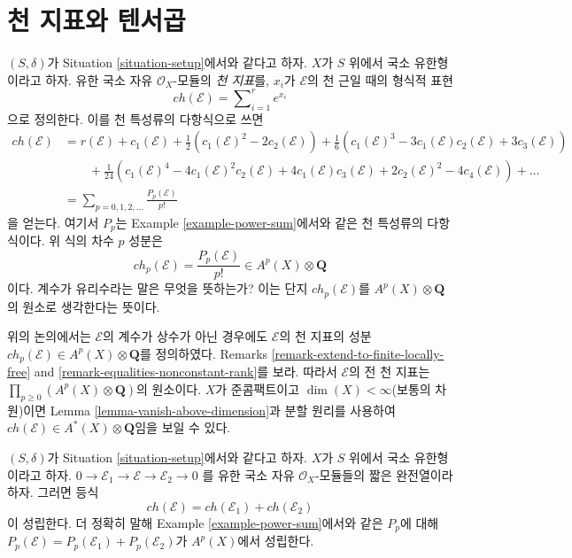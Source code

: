 \section{천 지표와 텐서곱}
\label{section-chern-classes-tensor}

\noindent
$(S, \delta)$가 Situation \ref{situation-setup}에서와 같다고 하자.
$X$가 $S$ 위에서 국소 유한형이라고 하자. 유한 국소 자유
$\mathcal{O}_X$-모듈의 {\it 천 지표}를, $x_i$가
${\mathcal E}$의 천 근일 때의 형식적 표현
$$
ch({\mathcal E}) = \sum\nolimits_{i=1}^r e^{x_i}
$$
으로 정의한다. 이를 천 특성류의 다항식으로 쓰면
\begin{align*}
ch(\mathcal{E})
& =
r(\mathcal{E})
+
c_1(\mathcal{E}) +
\frac{1}{2}(c_1(\mathcal{E})^2 - 2c_2(\mathcal{E}))
+
\frac{1}{6}(c_1(\mathcal{E})^3 - 3c_1(\mathcal{E})c_2(\mathcal{E}) + 3c_3(\mathcal{E})) \\
& \quad\quad +
\frac{1}{24}(c_1(\mathcal{E})^4 - 4c_1(\mathcal{E})^2c_2(\mathcal{E}) + 4c_1(\mathcal{E})c_3(\mathcal{E}) + 2c_2(\mathcal{E})^2 - 4c_4(\mathcal{E}))
+
\ldots \\
& =
\sum\nolimits_{p = 0, 1, 2, \ldots} \frac{P_p(\mathcal{E})}{p!}
\end{align*}
을 얻는다. 여기서 $P_p$는 Example \ref{example-power-sum}에서와 같은
천 특성류의 다항식이다. 위 식의 차수 $p$ 성분은
$$
ch_p(\mathcal{E}) = \frac{P_p(\mathcal{E})}{p!} \in A^p(X) \otimes \mathbf{Q}
$$
이다. 계수가 유리수라는 말은 무엇을 뜻하는가? 이는 단지
$ch_p(\mathcal{E})$를 $A^p(X) \otimes \mathbf{Q}$의 원소로
생각한다는 뜻이다.

\begin{remark}
\label{remark-extend-chern-character-to-finite-locally-free}
위의 논의에서는 $\mathcal{E}$의 계수가 상수가 아닌 경우에도
$\mathcal{E}$의 천 지표의 성분
$ch_p(\mathcal{E}) \in A^p(X) \otimes \mathbf{Q}$를 정의하였다.
Remarks \ref{remark-extend-to-finite-locally-free} and
\ref{remark-equalities-nonconstant-rank}를 보라. 따라서
$\mathcal{E}$의 전 천 지표는
$\prod_{p \geq 0} (A^p(X) \otimes \mathbf{Q})$의 원소이다.
$X$가 준콤팩트이고 $\dim(X) < \infty$(보통의 차원)이면 Lemma
\ref{lemma-vanish-above-dimension}과 분할 원리를 사용하여
$ch(\mathcal{E}) \in A^*(X) \otimes \mathbf{Q}$임을 보일 수 있다.
\end{remark}

\begin{lemma}
\label{lemma-chern-character-additive}
$(S, \delta)$가 Situation \ref{situation-setup}에서와 같다고 하자.
$X$가 $S$ 위에서 국소 유한형이라고 하자.
$
0 \to \mathcal{E}_1 \to \mathcal{E} \to \mathcal{E}_2 \to 0
$
를 유한 국소 자유 $\mathcal{O}_X$-모듈들의 짧은 완전열이라 하자.
그러면 등식
$$
ch(\mathcal{E}) = ch(\mathcal{E}_1) + ch(\mathcal{E}_2)
$$
이 성립한다. 더 정확히 말해 Example \ref{example-power-sum}에서와
같은 $P_p$에 대해
$P_p(\mathcal{E}) = P_p(\mathcal{E}_1) + P_p(\mathcal{E}_2)$가
$A^p(X)$에서 성립한다.
\end{lemma}

